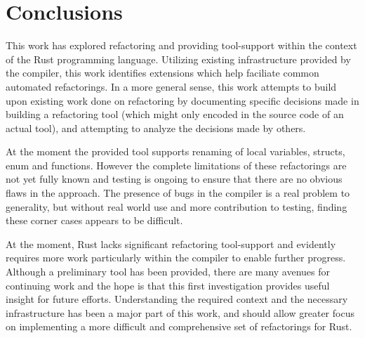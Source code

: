 \chapter{Conclusions}\label{C:con}
This work has explored refactoring and providing tool-support within the context of the Rust programming language. Utilizing existing infrastructure provided by the compiler, this work identifies extensions which help faciliate common automated refactorings. In a more general sense, this work attempts to build upon existing work done on refactoring by documenting specific decisions made in building a refactoring tool (which might only encoded in the source code of an actual tool), and attempting to analyze the decisions made by others. 


At the moment the provided tool supports renaming of local variables, structs, enum and functions. However the complete limitations of these refactorings are not yet fully known and testing is ongoing to ensure that there are no obvious flaws in the approach. The presence of bugs in the compiler is a real problem to generality, but without real world use and more contribution to testing, finding these corner cases appears to be difficult.

At the moment, Rust lacks significant refactoring tool-support and evidently requires more work particularly within the compiler to enable further progress. Although a preliminary tool has been provided, there are many avenues for continuing work and the hope is that this first investigation provides useful insight for future efforts. Understanding the required context and the necessary infrastructure has been a major part of this work, and should allow greater focus on implementing a more difficult and comprehensive set of refactorings for Rust.